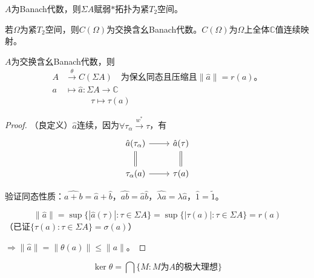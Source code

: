 \documentclass[lang=cn,a4paper,newtx,section]{elegantbook}
\begin{document}
\begin{proposition}
  $A$为Banach代数，则$\Sigma A$赋弱$*$拓扑为紧$T_2$空间。
\end{proposition}

\begin{proposition}
  若$\Omega$为紧$T_2$空间，则$C(\Omega)$为交换含幺Banach代数。$C(\Omega)$为$\Omega$上全体$\mathbb{C}$值连续映射。
\end{proposition}

\begin{theorem}[Gelfand变换]
  $A$为交换含幺Banach代数，则
  \begin{equation*}
    \begin{aligned}
      A &\xrightarrow{\theta} C(\Sigma A) \quad \text{为保幺同态且压缩且$\|\hat{a}\| = r(a)$。} \\
      a &\longmapsto \hat{a}: \Sigma A \longrightarrow \mathbb{C} \\
      & \quad\quad\quad \tau \longmapsto \tau(a)
    \end{aligned}
  \end{equation*}
  
\end{theorem}

\begin{proof}
  （良定义）$\hat{a}$连续，因为$\forall \tau_\alpha \xrightarrow{w^*} \tau$，有
  \begin{equation*}
    \begin{tikzcd}
      \hat{a}(\tau_\alpha) \arrow[r] \arrow[d, equal] & \hat{a}(\tau) \arrow[d, equal] \\
      \tau_\alpha(a) \arrow[r] & \tau(a)
    \end{tikzcd}
  \end{equation*}
  
  验证同态性质：$\widehat{a+b} = \hat{a} + \hat{b}$，$\widehat{ab} = \hat{a}\hat{b}$，$\widehat{\lambda a} = \lambda\hat{a}$，$\hat{1} = \tilde{1}$。
  
  \begin{equation*}
    \|\hat{a}\| = \sup\{|\hat{a}(\tau)| : \tau \in \Sigma A\} = \sup\{|\tau(a)| : \tau \in \Sigma A\} = r(a)
  \end{equation*}
  （已证$\{\tau(a) : \tau \in \Sigma A\} = \sigma(a)$）
  
  $\Rightarrow \|\hat{a}\| = \|\theta(a)\| \leq \|a\|$。
\end{proof}

\begin{theorem}[Jacobson根]
  \begin{equation*}
    \ker\theta = \bigcap\{M : M\text{为}A\text{的极大理想}\}
  \end{equation*}
\end{theorem}
\end{document}
